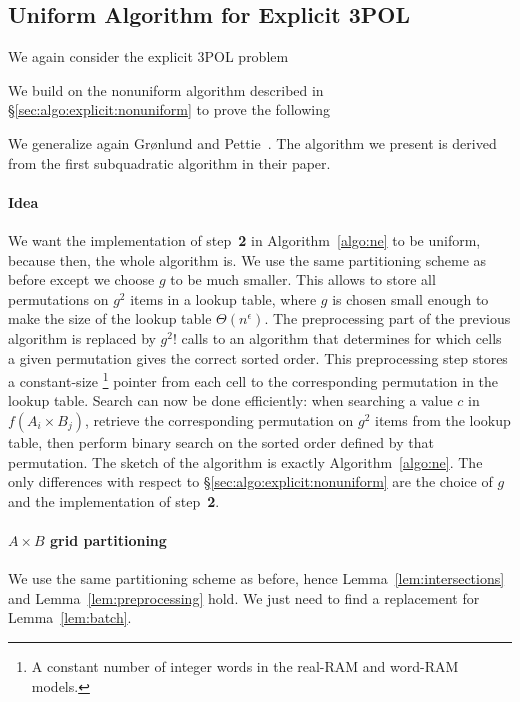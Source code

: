 \subsection{Uniform Algorithm for Explicit 3POL}%
\label{sec:algo:explicit:uniform}

We again consider the explicit 3POL problem
%
\ProblemPOLExplicit*

We build on the nonuniform algorithm described in
\S\ref{sec:algo:explicit:nonuniform} to prove the following
\restate{\TheoremPOLUniformExplicit*}

We generalize again Gr\o nlund and Pettie~\cite{GP18}. The
algorithm we present is derived from the first subquadratic algorithm in their
paper.

\paragraph{Idea}
We want the implementation of step~\textbf{2} in Algorithm~\ref{algo:ne} to be
uniform, because then, the whole algorithm is.
We use the same partitioning scheme as before except we choose $g$ to be much
smaller.
This allows to
store all permutations on $g^2$ items in a lookup table, where
$g$ is chosen small enough to make the size of the lookup table $\Theta(n^\epsilon)$.
The preprocessing part of the previous algorithm is replaced by $ g^2! $ calls to
an algorithm that determines for which cells a given permutation gives the
correct sorted
order. This preprocessing step stores a constant-size%
\footnote{A constant number of integer words
in the real-RAM and word-RAM models.}
pointer from each cell to
the corresponding permutation in the lookup table.
Search can now be done efficiently: when searching a value $c$ in $f(A_i
\times B_j)$, retrieve the corresponding permutation on $g^2$ items from the
lookup table,
then perform binary search on the sorted order defined by that permutation.
The sketch of the algorithm is exactly Algorithm~\ref{algo:ne}. The only
differences with respect to \S\ref{sec:algo:explicit:nonuniform} are the choice
of $g$ and the implementation of step~\textbf{2}.

\paragraph{$A \times B$ grid partitioning}
We use the same partitioning scheme as before, hence
Lemma~\ref{lem:intersections} and Lemma~\ref{lem:preprocessing} hold.
We just need to find a replacement for Lemma~\ref{lem:batch}.


